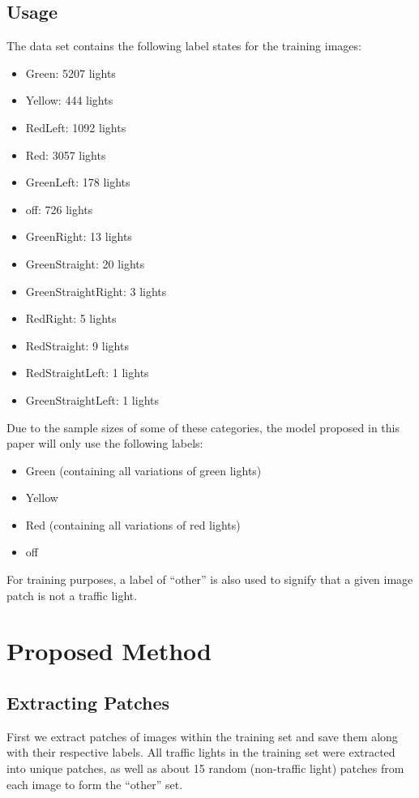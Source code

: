\documentclass[a4paper]{article}
\begin{document}
\subsection{Usage}
The data set contains the following label states for the training images:
\begin{itemize}
    \item Green: 5207 lights
    \item Yellow: 444 lights
    \item RedLeft: 1092 lights
    \item Red: 3057 lights
    \item GreenLeft: 178 lights
    \item off: 726 lights
    \item GreenRight: 13 lights
    \item GreenStraight: 20 lights
    \item GreenStraightRight: 3 lights
    \item RedRight: 5 lights
    \item RedStraight: 9 lights
    \item RedStraightLeft: 1 lights
    \item GreenStraightLeft: 1 lights
\end{itemize}
Due to the sample sizes of some of these categories, the model proposed in this paper will only use the following labels:
\begin{itemize}
    \item Green (containing all variations of green lights)
    \item Yellow
    \item Red (containing all variations of red lights)
    \item off
\end{itemize}
For training purposes, a label of ``other'' is also used to signify that a given image patch is not a traffic light.

\section{Proposed Method}
\subsection{Extracting Patches}
First we extract patches of images within the training set and save them along with their respective labels.  All traffic lights in the training set were extracted into unique patches, as well as about 15 random (non-traffic light) patches from each image to form the ``other'' set.
\end{document}
